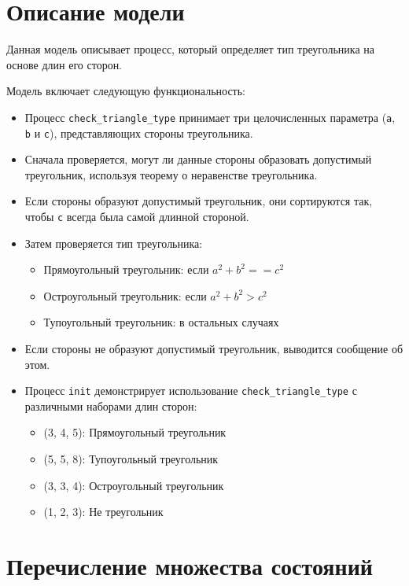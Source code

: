 \documentclass{bmstu}
\begin{document}

\section{Описание модели}

Данная модель описывает процесс, который определяет тип треугольника на основе длин его сторон.

Модель включает следующую функциональность:
\begin{itemize}
  \item Процесс \texttt{check\_triangle\_type} принимает три целочисленных параметра (\texttt{a}, \texttt{b} и \texttt{c}), представляющих стороны треугольника.
  \item Сначала проверяется, могут ли данные стороны образовать допустимый треугольник, используя теорему о неравенстве треугольника.
  \item Если стороны образуют допустимый треугольник, они сортируются так, чтобы \texttt{c} всегда была самой длинной стороной.
  \item Затем проверяется тип треугольника:
  \begin{itemize}
     \item Прямоугольный треугольник: если \(a^2 + b^2 == c^2\)
     \item Остроугольный треугольник: если \(a^2 + b^2 > c^2\)
     \item Тупоугольный треугольник: в остальных случаях
  \end{itemize}
  \item Если стороны не образуют допустимый треугольник, выводится сообщение об этом.
  \item Процесс \texttt{init} демонстрирует использование \texttt{check\_triangle\_type} с различными наборами длин сторон:
  \begin{itemize}
    \item (3, 4, 5): Прямоугольный треугольник
    \item (5, 5, 8): Тупоугольный треугольник
    \item (3, 3, 4): Остроугольный треугольник
    \item (1, 2, 3): Не треугольник
  \end{itemize}
\end{itemize}

\clearpage
\section{Перечисление множества состояний}
\end{document}
